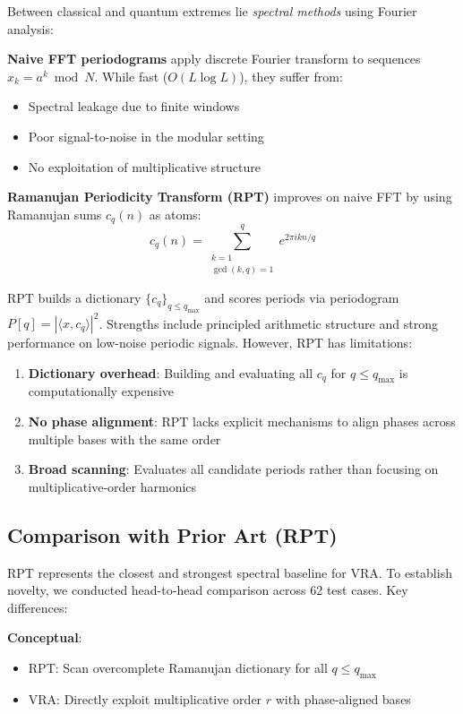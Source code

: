 \documentclass[conference]{IEEEtran}
\begin{document}
Between classical and quantum extremes lie \emph{spectral methods} using Fourier analysis:

\textbf{Naive FFT periodograms} apply discrete Fourier transform to sequences $x_k = a^k \bmod N$. While fast ($O(L \log L)$), they suffer from:
\begin{itemize}
    \item Spectral leakage due to finite windows
    \item Poor signal-to-noise in the modular setting
    \item No exploitation of multiplicative structure
\end{itemize}

\textbf{Ramanujan Periodicity Transform (RPT)}\cite{vaidyanathan2014ramanujan,planat2002ramanujan} improves on naive FFT by using Ramanujan sums $c_q(n)$ as atoms:
\begin{equation}
c_q(n) = \sum_{\substack{k=1 \\ \gcd(k,q)=1}}^q e^{2\pi i kn/q}
\end{equation}

RPT builds a dictionary $\{c_q\}_{q \leq q_{\max}}$ and scores periods via periodogram $P[q] = |\langle x, c_q \rangle|^2$. Strengths include principled arithmetic structure and strong performance on low-noise periodic signals. However, RPT has limitations:

\begin{enumerate}
    \item \textbf{Dictionary overhead}: Building and evaluating all $c_q$ for $q \leq q_{\max}$ is computationally expensive
    \item \textbf{No phase alignment}: RPT lacks explicit mechanisms to align phases across multiple bases with the same order
    \item \textbf{Broad scanning}: Evaluates all candidate periods rather than focusing on multiplicative-order harmonics
\end{enumerate}

\subsection{Comparison with Prior Art (RPT)}

RPT represents the closest and strongest spectral baseline for VRA. To establish novelty, we conducted head-to-head comparison across 62 test cases. Key differences:

\textbf{Conceptual}:
\begin{itemize}
    \item RPT: Scan overcomplete Ramanujan dictionary for all $q \leq q_{\max}$
    \item VRA: Directly exploit multiplicative order $r$ with phase-aligned bases
\end{itemize}
\end{document}
